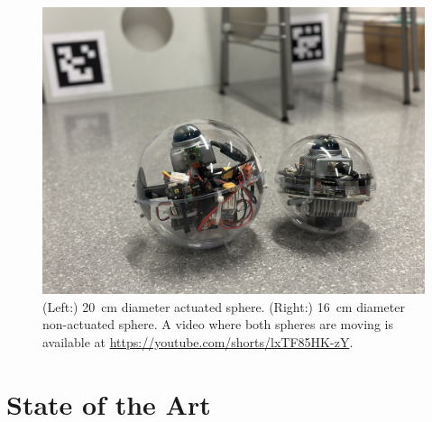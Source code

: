 \documentclass[a4paper, conference]{IEEEtran}
\begin{document}
\begin{figure}[t]
\centerline{\includegraphics[width=0.95\columnwidth]{pics/two_spheres.jpg}}
\caption{(Left:) \SI{20}{\centi\meter} diameter actuated sphere.
(Right:) \SI{16}{\centi\meter} diameter non-actuated sphere.
A video where both spheres are moving is available at \url{https://youtube.com/shorts/lxTF85HK-zY}.}
\vspace{-15pt}
\label{fig:twospheres}
\end{figure}
\section{State of the Art}
\end{document}
